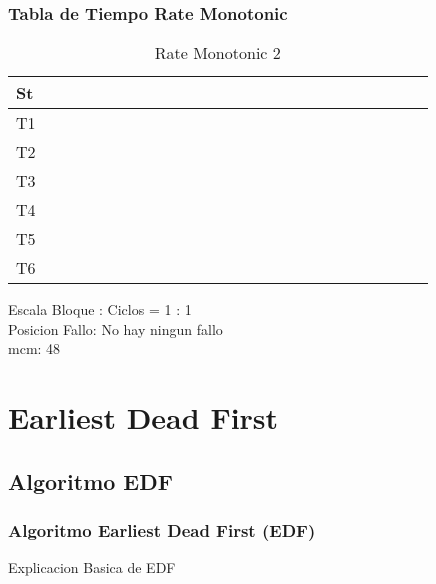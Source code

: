 \documentclass[xcolor=table]{beamer}
\begin{document}
\begin{frame} 
\frametitle{Tabla de Tiempo  Rate Monotonic } 
\begin{table} 
\centering 
\begin{tabular}{|l|l|l|l|l|l|l|l|l|l|l|l|l|l|l|l|l|l|l|l|l|l|l|l|l|} 
\hline 
St & \cellcolor{green} & \cellcolor{green} & \cellcolor{green} & \cellcolor{green} & \cellcolor{green} & \cellcolor{green} & \cellcolor{green} & \cellcolor{green} & \cellcolor{green} & \cellcolor{green} & \cellcolor{green} & \cellcolor{green} & \cellcolor{green} & \cellcolor{green} & \cellcolor{green} & \cellcolor{green} & \cellcolor{green} & \cellcolor{green} & \cellcolor{green} & \cellcolor{green} & \cellcolor{green} & \cellcolor{green} & \cellcolor{green} & \cellcolor{green} \\ \hline 
T1 & & & & & & & & & & & & & & & & & & & & & & & & \\ \hline 
T2 & & & & & & & & & & & & & & & & & & & & & & & & \\ \hline 
T3 & & & & & & & & & & & & & & & & & & & & & & & & \\ \hline 
T4 & & & & & & & & & & & & & & & & & & & & & & & & \\ \hline 
T5 & & & & & & & & & & & & & & & & & & & & & & & & \\ \hline 
T6 & & & & & & & & & & & & & & & & & & & & & & & & \\ \hline 
\end{tabular} 
\caption{ Rate Monotonic 2 } 
\end{table} 
Escala Bloque : Ciclos = 1 : 1 \\ 
Posicion Fallo: No hay ningun fallo \\ 
mcm:  48 \\ 
\end{frame} 


\section{Earliest Dead First}

\subsection{Algoritmo EDF}

\begin{frame} 
\frametitle{Algoritmo Earliest Dead First (EDF)} 
Explicacion Basica de EDF \\
\end{frame}
\end{document}
